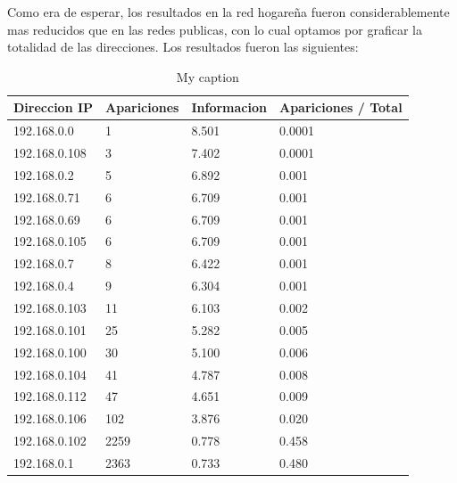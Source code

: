 Como era de esperar, los resultados en la red hogareña fueron considerablemente mas reducidos que en las redes publicas, con lo cual optamos por graficar la totalidad de las direcciones. Los resultados fueron las siguientes:

%

\begin{table}[H]
\centering
\caption{My caption}
\label{my-label}
\begin{tabular}{@{}llll@{}}
\toprule
Direccion IP  & Apariciones & Informacion & Apariciones / Total \\ \midrule
192.168.0.0   & 1           & 8.501       & 0.0001              \\
192.168.0.108 & 3           & 7.402       & 0.0001              \\
192.168.0.2   & 5           & 6.892       & 0.001               \\
192.168.0.71  & 6           & 6.709       & 0.001               \\
192.168.0.69  & 6           & 6.709       & 0.001               \\
192.168.0.105 & 6           & 6.709       & 0.001               \\
192.168.0.7   & 8           & 6.422       & 0.001               \\
192.168.0.4   & 9           & 6.304       & 0.001               \\
192.168.0.103 & 11          & 6.103       & 0.002               \\
192.168.0.101 & 25          & 5.282       & 0.005               \\
192.168.0.100 & 30          & 5.100       & 0.006               \\
192.168.0.104 & 41          & 4.787       & 0.008               \\
192.168.0.112 & 47          & 4.651       & 0.009               \\
192.168.0.106 & 102         & 3.876       & 0.020               \\
192.168.0.102 & 2259        & 0.778       & 0.458               \\
192.168.0.1   & 2363        & 0.733       & 0.480               \\ \bottomrule
\end{tabular}
\end{table}

